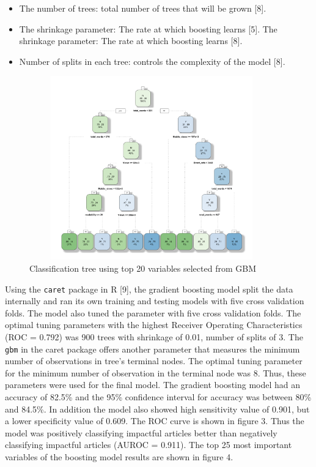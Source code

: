 \documentclass[10pt,letterpaper]{article}
\providecommand{\tightlist}{%
  \setlength{\itemsep}{0pt}\setlength{\parskip}{0pt}}
\begin{document}
\begin{itemize}
\tightlist
\item
  The number of trees: total number of trees that will be grown {[}8{]}.
\item
  The shrinkage parameter: The rate at which boosting learns {[}5{]}.
  The shrinkage parameter: The rate at which boosting learns {[}8{]}.
\item
  Number of splits in each tree: controls the complexity of the model
  {[}8{]}.
\end{itemize}

\begin{figure}
\includegraphics[width=400px,height=300px]{classification-Tree} \caption{ Classification tree using top 20 variables selected from GBM}\label{fig:unnamed-chunk-2}
\end{figure}

Using the \texttt{caret} package in R {[}9{]}, the gradient boosting
model split the data internally and ran its own training and testing
models with five cross validation folds. The model also tuned the
parameter with five cross validation folds. The optimal tuning
parameters with the highest Receiver Operating Characteristics (ROC =
0.792) was 900 trees with shrinkage of 0.01, number of splits of 3. The
\texttt{gbm} in the caret package offers another parameter that measures
the minimum number of observations in tree's terminal nodes. The optimal
tuning parameter for the minimum number of observation in the terminal
node was 8. Thus, these parameters were used for the final model. The
gradient boosting model had an accuracy of 82.5\% and the 95\%
confidence interval for accuracy was between 80\% and 84.5\%. In
addition the model also showed high sensitivity value of 0.901, but a
lower specificity value of 0.609. The ROC curve is shown in figure 3.
Thus the model was positively classifying impactful articles better than
negatively classifying impactful articles (AUROC = 0.911). The top 25
most important variables of the boosting model results are shown in
figure 4.
\end{document}
